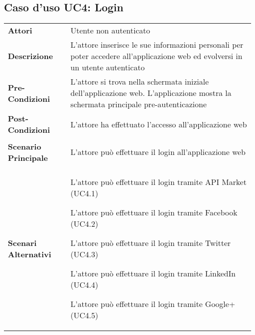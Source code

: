 \subsection{Caso d'uso UC4: Login}
\label{UC4}

\begin{longtable}{ l | p{11cm}}
	\hline
	\rowcolor{Gray}
	 \multicolumn{2}{c}{UC4 - Login}\\
	 \hline
	\textbf{Attori} & Utente non autenticato \\
	\textbf{Descrizione} & L'attore inserisce le sue informazioni personali per poter accedere all'applicazione web ed evolversi in un utente autenticato \\
	\textbf{Pre-Condizioni} & L'attore si trova nella schermata iniziale dell'applicazione web. L'applicazione mostra la schermata principale pre-autenticazione \\
	\textbf{Post-Condizioni} & L'attore ha effettuato l'accesso all'applicazione web \\
	\textbf{Scenario Principale} & 
	\begin{enumerate*}[label=(\arabic*.),itemjoin={\newline}]
		\item L'attore può effettuare il login all'applicazione web
	\end{enumerate*}\\
	\textbf{Scenari Alternativi} & 
	\begin{enumerate*}[label=(\arabic*.),itemjoin={\newline}]
		\item L'attore può effettuare il login tramite API Market (UC4.1)
		\item L'attore può effettuare il login tramite Facebook (UC4.2)
		\item L'attore può effettuare il login tramite Twitter (UC4.3)
		\item L'attore può effettuare il login tramite LinkedIn (UC4.4)
		\item L'attore può effettuare il login tramite Google+ (UC4.5)
	\end{enumerate*}\\
\end{longtable}